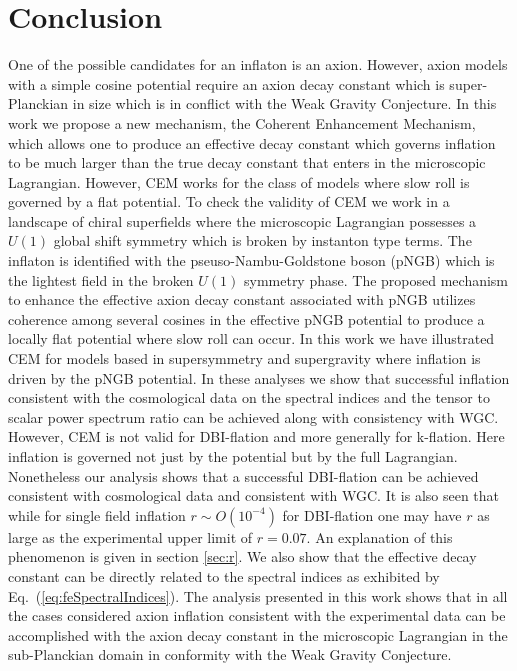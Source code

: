 \documentclass[12pt]{article}
\begin{document}
\section{Conclusion \label{sec:Conclusion}}
One of the possible candidates for an inflaton is an axion.
However, axion models with a simple cosine potential require an axion decay constant which is super-Planckian in size which is in conflict with the Weak Gravity Conjecture.
In this work we propose a new mechanism, the Coherent Enhancement Mechanism, which allows one to produce an effective decay constant which governs inflation to be much larger than the true decay constant that enters in the microscopic Lagrangian.
However, CEM works for the class of models where slow roll is governed by a flat potential.
To check the validity of CEM we work in a landscape of chiral superfields where the microscopic Lagrangian possesses a $U\left(1\right)$ global shift symmetry which is broken by instanton type terms.
The inflaton is identified with the pseuso-Nambu-Goldstone boson (pNGB) which is the lightest field in the broken $U\left(1\right)$ symmetry phase.
The proposed mechanism to enhance the effective axion decay constant associated with pNGB utilizes coherence among several cosines in the effective pNGB potential to produce a locally flat potential where slow roll can occur.
In this work we have illustrated CEM for models based in supersymmetry and supergravity where inflation is driven by the pNGB potential.
In these analyses we show that successful inflation consistent with the cosmological data on the spectral indices and the tensor to scalar power spectrum ratio can be achieved along with consistency with WGC.
However, CEM is not valid for DBI-flation and more generally for k-flation.
Here inflation is governed not just by the potential but by the full Lagrangian.
Nonetheless our analysis shows that a successful DBI-flation can be achieved consistent with cosmological data and consistent with WGC.
It is also seen that while for single field inflation $r \sim O\left(10^{-4}\right)$ for DBI-flation one may have $r$ as large as the experimental upper limit of $r = 0.07$.
An explanation of this phenomenon is given in section \ref{sec:r}.
We also show that the effective decay constant can be directly related to the spectral indices as exhibited by Eq.~(\ref{eq:feSpectralIndices}).
The analysis presented in this work shows that in all the cases considered axion inflation consistent with the experimental data can be accomplished with the axion decay constant in the microscopic Lagrangian in the sub-Planckian domain in conformity with the Weak Gravity Conjecture.\\~\\~\\
\end{document}
